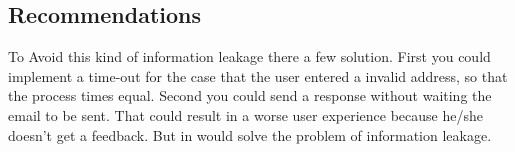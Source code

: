 \subsection{Recommendations}
To Avoid this kind of information leakage  there a few solution. First you could implement a time-out for the case that the user entered a invalid address, so that the process times equal. Second you could send a response without waiting the email to be sent.
That could result in a worse user experience because he/she doesn't get a feedback. But in would solve the problem of information leakage.

